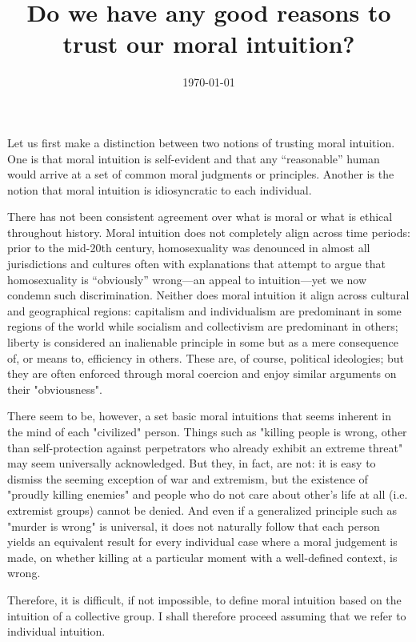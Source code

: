 \documentclass{scrartcl}
\title{Do we have any good reasons to trust our moral intuition?}
\author{\today}
\date{}
\begin{document}
\maketitle


Let us first make a distinction between two notions of trusting moral intuition. One is that moral intuition is self-evident and that any ``reasonable'' human would arrive at a set of common moral judgments or principles. Another is the notion that moral intuition is idiosyncratic to each individual.

There has not been consistent agreement over what is moral or what is ethical throughout history. Moral intuition does not completely align across time periods: prior to the mid-20th century, homosexuality was denounced in almost all jurisdictions and cultures often with explanations that attempt to argue that homosexuality is ``obviously'' wrong---an appeal to intuition---yet we now condemn such discrimination. Neither does moral intuition it align across cultural and geographical regions: capitalism and individualism are predominant in some regions of the world while socialism and collectivism are predominant in others; liberty is considered an inalienable principle in some but as a mere consequence of, or means to, efficiency in others. These are, of course, political ideologies; but they are often enforced through moral coercion and enjoy similar arguments on their "obviousness".

There seem to be, however, a set basic moral intuitions that seems inherent in the mind of each "civilized" person. Things such as "killing people is wrong, other than self-protection against perpetrators who already exhibit an extreme threat" may seem universally acknowledged. But they, in fact, are not: it is easy to dismiss the seeming exception of war and extremism, but the existence of "proudly killing enemies" and people who do not care about other's life at all (i.e. extremist groups) cannot be denied. And even if a generalized principle such as "murder is wrong" is universal, it does not naturally follow that each person yields an equivalent result for every individual case where a moral judgement is made, on whether killing at a particular moment with a well-defined context, is wrong.

Therefore, it is difficult, if not impossible, to define moral intuition based on the intuition of a collective group. I shall therefore proceed assuming that we refer to individual intuition.
\end{document}
